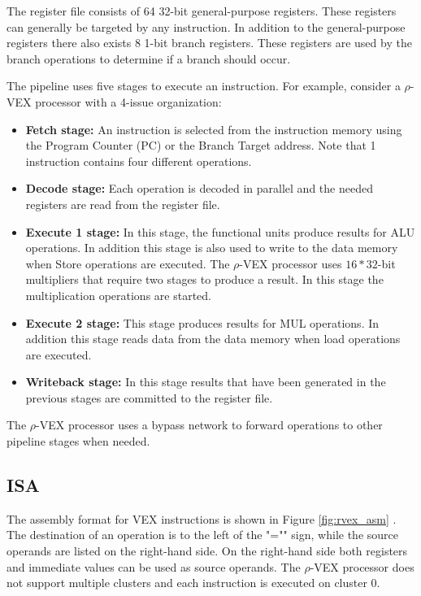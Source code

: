The register file consists of 64 32-bit general-purpose registers. These registers can generally be targeted by any instruction. In addition to the general-purpose registers there also exists 8 1-bit branch registers. These registers are used by the branch operations to determine if a branch should occur.

The pipeline uses five stages to execute an instruction. For example, consider a $\rho$-VEX processor with a 4-issue organization:

\begin{itemize}
  \item \textbf{Fetch stage:} An instruction is selected from the instruction memory using the Program Counter (PC) or the Branch Target address. Note that 1 instruction contains four different operations.
  \item \textbf{Decode stage:} Each operation is decoded in parallel and the needed registers are read from the register file. 
  \item \textbf{Execute 1 stage:} In this stage, the functional units produce results for ALU operations. In addition this stage is also used to write to the data memory when Store operations are executed. The $\rho$-VEX processor uses $16*32$-bit multipliers that require two stages to produce a result. In this stage the multiplication operations are started.
  \item \textbf{Execute 2 stage:} This stage produces results for MUL operations. In addition this stage reads data from the data memory when load operations are executed.
  \item \textbf{Writeback stage:} In this stage results that have been generated in the previous stages are committed to the register file.
\end{itemize}

The $\rho$-VEX processor uses a bypass network to forward operations to other pipeline stages when needed.

\subsection{ISA}
The assembly format for VEX instructions is shown in Figure \ref{fig:rvex_asm} \cite{Joseph-A.-Fisher:2012rm}. The destination of an operation is to the left of the "="" sign, while the source operands are listed on the right-hand side. On the right-hand side both registers and immediate values can be used as source operands. The $\rho$-VEX processor does not support multiple clusters and each instruction is executed on cluster 0.

